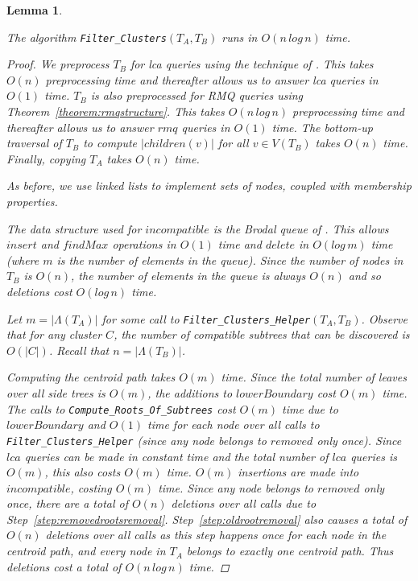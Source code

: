 \documentclass{article}
\newcommand{\leafset}{\Lambda}
\newtheorem{filterclustersruntime}[incompatibility]{Lemma}
\begin{document}
    \bigskip
    \begin{filterclustersruntime}
        \label{lem:filterclustersruntime}

        The algorithm \texttt{Filter\_Clusters}$(T_A, T_B)$ runs in $O(n\,log\,n)$ time.

        \begin{proof}
            We preprocess $T_B$ for \textit{lca} queries using the technique of \cite{bender2000lca}. This takes $O(n)$ preprocessing time and thereafter allows us to answer \textit{lca} queries in $O(1)$ time. $T_B$ is also preprocessed for RMQ queries using Theorem~\ref{theorem:rmqstructure}. This takes $O(n\,log\,n)$ preprocessing time and thereafter allows us to answer $rmq$ queries in $O(1)$ time. The bottom-up traversal of $T_B$ to compute $|children(v)|$ for all $v \in V(T_B)$ takes $O(n)$ time. Finally, copying $T_A$ takes $O(n)$ time.

            As before, we use linked lists to implement sets of nodes, coupled with membership properties.

            The data structure used for $incompatible$ is the Brodal queue of \cite{brodal1995fast}. This allows $insert$ and $findMax$ operations in $O(1)$ time and $delete$ in $O(log\,m)$ time (where $m$ is the number of elements in the queue). Since the number of nodes in $T_B$ is $O(n)$, the number of elements in the queue is always $O(n)$ and so deletions cost $O(log\,n)$ time.

            Let $m = |\leafset(T_A)|$ for some call to \texttt{Filter\_Clusters\_Helper}$(T_A, T_B)$. Observe that for any cluster $C$, the number of compatible subtrees that can be discovered is $O(|C|)$. Recall that $n = |\leafset(T_B)|$.

            Computing the centroid path takes $O(m)$ time. Since the total number of leaves over all side trees is $O(m)$, the additions to $lowerBoundary$ cost $O(m)$ time. The calls to \texttt{Compute\_Roots\_Of\_Subtrees} cost $O(m)$ time due to $lowerBoundary$ and $O(1)$ time for each node over all calls to \texttt{Filter\_Clusters\_Helper} (since any node belongs to $removed$ only once). Since $lca$ queries can be made in constant time and the total number of $lca$ queries is $O(m)$, this also costs $O(m)$ time. $O(m)$ insertions are made into $incompatible$, costing $O(m)$ time. Since any node belongs to $removed$ only once, there are a total of $O(n)$ deletions over all calls due to Step~\ref{step:removedrootsremoval}. Step~\ref{step:oldrootremoval} also causes a total of $O(n)$ deletions over all calls as this step happens once for each node in the centroid path, and every node in $T_A$ belongs to exactly one centroid path. Thus deletions cost a total of $O(n\,log\,n)$ time.


\end{proof}
\end{filterclustersruntime}
\end{document}
